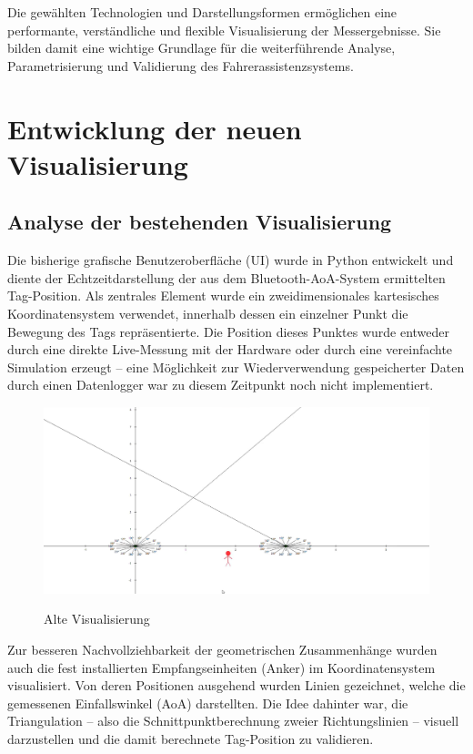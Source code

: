 \documentclass[a4paper, 12pt]{article} %
\begin{document}
Die gewählten Technologien und Darstellungsformen ermöglichen eine performante, verständliche und flexible Visualisierung der Messergebnisse. Sie 
bilden damit eine wichtige Grundlage für die weiterführende Analyse, Parametrisierung und Validierung des Fahrerassistenzsystems.

\clearpage

\section{Entwicklung der neuen Visualisierung}
\subsection{Analyse der bestehenden Visualisierung}

Die bisherige grafische Benutzeroberfläche (\ac{UI}) wurde in Python entwickelt und diente der Echtzeitdarstellung der aus dem Bluetooth-\ac{AoA}-System ermittelten
 Tag-Position. Als zentrales Element wurde ein zweidimensionales kartesisches Koordinatensystem verwendet, innerhalb dessen ein einzelner Punkt die 
 Bewegung des Tags repräsentierte. Die Position dieses Punktes wurde entweder durch eine direkte Live-Messung mit der Hardware oder durch eine 
 vereinfachte Simulation erzeugt – eine Möglichkeit zur Wiederverwendung gespeicherter Daten durch einen Datenlogger war zu diesem Zeitpunkt noch nicht
  implementiert.

\begin{figure}[H]
    \includegraphics[width=1\linewidth]{images/Alte Visualisierung.png}\\[1ex]
    \centering
    \caption{Alte Visualisierung}
    \label{ABBILDUNG}
\end{figure}


Zur besseren Nachvollziehbarkeit der geometrischen Zusammenhänge wurden auch die fest installierten Empfangseinheiten (Anker) im Koordinatensystem 
visualisiert. Von deren Positionen ausgehend wurden Linien gezeichnet, welche die gemessenen Einfallswinkel (\ac{AoA}) darstellten. Die 
Idee dahinter war, die Triangulation – also die Schnittpunktberechnung zweier Richtungslinien – visuell darzustellen und die damit berechnete Tag-Position
 zu validieren.
\end{document}
